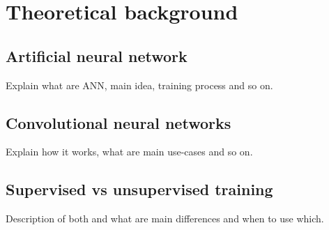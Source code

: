 \chapter{Theoretical background}
\section{Artificial neural network}
Explain what are ANN, main idea, training process and so on.

\section{Convolutional neural networks}
Explain how it works, what are main use-cases and so on.

\section{Supervised vs unsupervised training}
Description of both and what are main differences and when to use which.